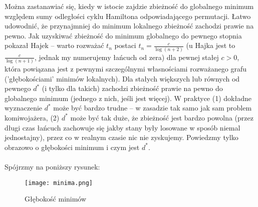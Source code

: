 \documentclass[a4paper]{article}
\theoremstyle{defn}
\theoremstyle{theorem}
\theoremstyle{lemma}
\theoremstyle{cor}
\theoremstyle{fact}
\begin{document}
Można zastanawiać się, kiedy w istocie zajdzie zbieżność do globalnego minimum względem sumy odległości cyklu Hamiltona odpowiadającego permutacji. Łatwo udowodnić, że przynajmniej do minimum lokalnego zbieżność zachodzi prawie na pewno. Jak uzyskiwać zbieżność do minimum globalnego do pewnego stopnia pokazał Hajek \cite{hajek} – warto rozważać $t_n$ postaci $t_n = \frac{c}{\log(n+2)}$ (u Hajka jest to $\frac{c}{\log(n+1)}$, jednak my numerujemy łańcuch od zera) dla pewnej stałej $c>0$, która powiązana jest z pewnymi szczególnymi własnościami rozważanego grafu ('głębokościami' minimów lokalnych). Dla stałych większych lub równych od pewnego $d^*$ (i tylko dla takich) zachodzi zbieżność prawie na pewno do globalnego minimum (jednego z nich, jeśli jest więcej). W praktyce (1) dokładne wyznaczenie $d^*$ może być bardzo trudne – w zasadzie tak samo jak sam problem komiwojażera, (2) $d^*$ może być tak duże, że zbieżność jest bardzo powolna (przez długi czas łańcuch zachowuje się jakby stany były losowane w sposób niemal jednostajny), przez co w realnym czasie nic nie zyskujemy.  Powiedzmy tylko obrazowo o głębokości minimum i czym jest $d^*$. \\\\
Spójrzmy na poniższy rysunek:\\


\begin{figure}[h]
\centering
\texttt{[image: minima.png]}
\caption{Głębokość minimów}
\end{figure}
\end{document}
